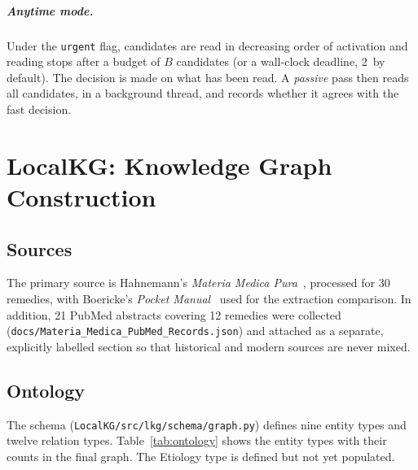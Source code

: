 \documentclass[12pt,a4paper,oneside]{report}
\newcommand{\code}[1]{\texttt{\small #1}}
\newcommand{\ms}{\,\text{ms}}
\begin{document}
\paragraph{Anytime mode.} Under the \code{urgent} flag, candidates are read in decreasing order of activation and reading stops after a budget of $B$ candidates (or a wall-clock deadline, 2\ms{} by default). The decision is made on what has been read. A \emph{passive} pass then reads all candidates, in a background thread, and records whether it agrees with the fast decision.

\chapter{LocalKG: Knowledge Graph Construction}\label{ch:kg}
\section{Sources}
The primary source is Hahnemann's \emph{Materia Medica Pura}~\cite{hahnemann1880}, processed for 30 remedies, with Boericke's \emph{Pocket Manual}~\cite{boericke1927} used for the extraction comparison. In addition, 21 PubMed abstracts covering 12 remedies were collected (\code{docs/Materia\_Medica\_PubMed\_Records.json}) and attached as a separate, explicitly labelled section so that historical and modern sources are never mixed.

\section{Ontology}
The schema (\code{LocalKG/src/lkg/schema/graph.py}) defines nine entity types and twelve relation types. Table~\ref{tab:ontology} shows the entity types with their counts in the final graph. The Etiology type is defined but not yet populated.
\end{document}
